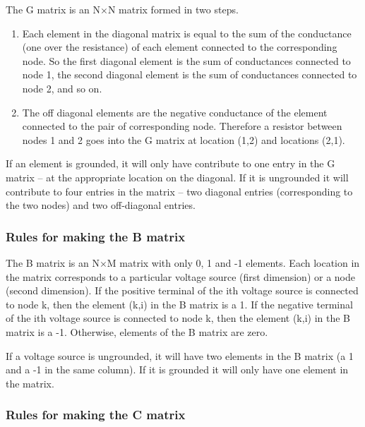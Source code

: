 The G matrix is an N$\times$N matrix formed in two steps.

\begin{enumerate}
\item
Each element in the diagonal matrix is equal to the sum of the
conductance (one over the resistance) of each element connected to the
corresponding node.  So the first diagonal element is the sum of
conductances connected to node 1, the second diagonal element is the
sum of conductances connected to node 2, and so on.
\item
The off diagonal elements are the negative conductance of the element
connected to the pair of corresponding node.  Therefore a resistor
between nodes 1 and 2 goes into the G matrix at location (1,2) and
locations (2,1).
\end{enumerate}

If an element is grounded, it will only have contribute to one entry
in the G matrix -- at the appropriate location on the diagonal.  If it
is ungrounded it will contribute to four entries in the matrix -- two
diagonal entries (corresponding to the two nodes) and two off-diagonal
entries.

\subsubsection{Rules for making the B matrix}

The B matrix is an N$\times$M matrix with only 0, 1 and -1 elements.
Each location in the matrix corresponds to a particular voltage source
(first dimension) or a node (second dimension).  If the positive
terminal of the ith voltage source is connected to node k, then the
element (k,i) in the B matrix is a 1.  If the negative terminal of the
ith voltage source is connected to node k, then the element (k,i) in
the B matrix is a -1.  Otherwise, elements of the B matrix are zero.

\addvspace{12pt}

If a voltage source is ungrounded, it will have two elements in the B
matrix (a 1 and a -1 in the same column).  If it is grounded it will
only have one element in the matrix.

\subsubsection{Rules for making the C matrix}

